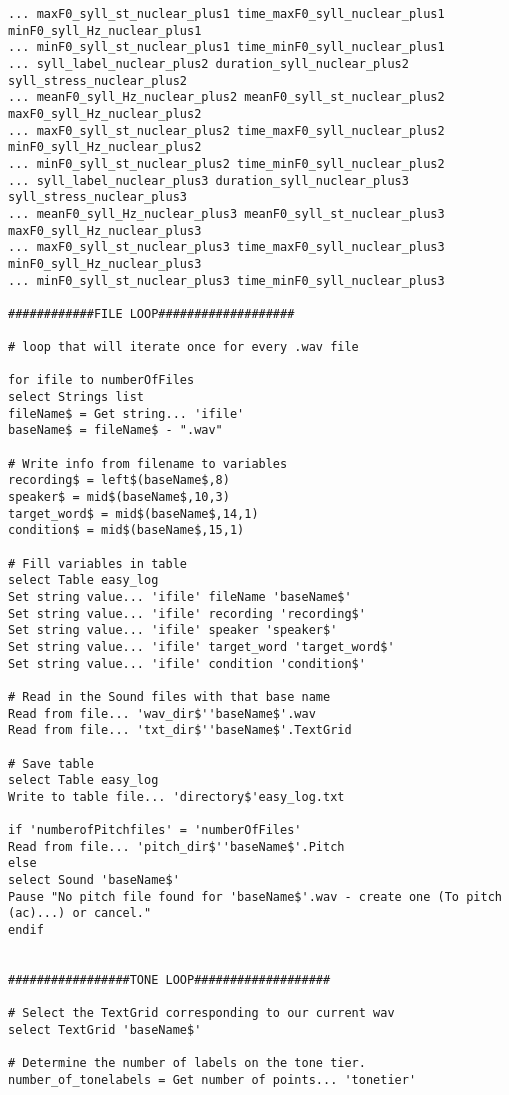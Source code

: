\begin{Verbatim}[fontsize=\tiny]
... maxF0_syll_st_nuclear_plus1 time_maxF0_syll_nuclear_plus1 minF0_syll_Hz_nuclear_plus1 
... minF0_syll_st_nuclear_plus1 time_minF0_syll_nuclear_plus1
... syll_label_nuclear_plus2 duration_syll_nuclear_plus2 syll_stress_nuclear_plus2 
... meanF0_syll_Hz_nuclear_plus2 meanF0_syll_st_nuclear_plus2 maxF0_syll_Hz_nuclear_plus2 
... maxF0_syll_st_nuclear_plus2 time_maxF0_syll_nuclear_plus2 minF0_syll_Hz_nuclear_plus2 
... minF0_syll_st_nuclear_plus2 time_minF0_syll_nuclear_plus2
... syll_label_nuclear_plus3 duration_syll_nuclear_plus3 syll_stress_nuclear_plus3 
... meanF0_syll_Hz_nuclear_plus3 meanF0_syll_st_nuclear_plus3 maxF0_syll_Hz_nuclear_plus3 
... maxF0_syll_st_nuclear_plus3 time_maxF0_syll_nuclear_plus3 minF0_syll_Hz_nuclear_plus3 
... minF0_syll_st_nuclear_plus3 time_minF0_syll_nuclear_plus3

############FILE LOOP###################

# loop that will iterate once for every .wav file

for ifile to numberOfFiles
select Strings list
fileName$ = Get string... 'ifile'
baseName$ = fileName$ - ".wav"

# Write info from filename to variables
recording$ = left$(baseName$,8)
speaker$ = mid$(baseName$,10,3)
target_word$ = mid$(baseName$,14,1)
condition$ = mid$(baseName$,15,1)

# Fill variables in table
select Table easy_log
Set string value... 'ifile' fileName 'baseName$'
Set string value... 'ifile' recording 'recording$'
Set string value... 'ifile' speaker 'speaker$'
Set string value... 'ifile' target_word 'target_word$'
Set string value... 'ifile' condition 'condition$'

# Read in the Sound files with that base name
Read from file... 'wav_dir$''baseName$'.wav
Read from file... 'txt_dir$''baseName$'.TextGrid

# Save table 
select Table easy_log
Write to table file... 'directory$'easy_log.txt

if 'numberofPitchfiles' = 'numberOfFiles' 
Read from file... 'pitch_dir$''baseName$'.Pitch
else
select Sound 'baseName$'
Pause "No pitch file found for 'baseName$'.wav - create one (To pitch (ac)...) or cancel."
endif


#################TONE LOOP###################

# Select the TextGrid corresponding to our current wav
select TextGrid 'baseName$'

# Determine the number of labels on the tone tier.
number_of_tonelabels = Get number of points... 'tonetier'


\end{Verbatim}
